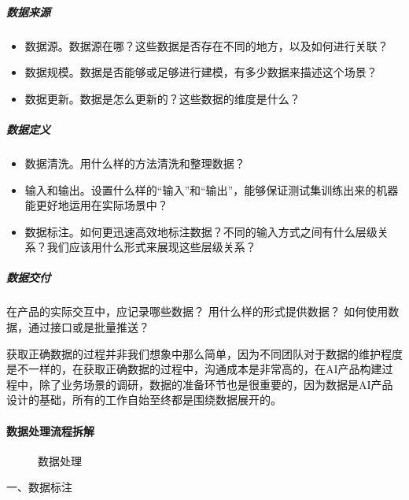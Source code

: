 \documentclass[letterpaper,10pt,english]{sphinxmanual}
\begin{document}
\subparagraph{数据来源}
\label{\detokenize{chapter_project/Data Process:id3}}\begin{itemize}
\item {} 
数据源。数据源在哪？这些数据是否存在不同的地方，以及如何进行关联？

\item {} 
数据规模。数据是否能够或足够进行建模，有多少数据来描述这个场景？

\item {} 
数据更新。数据是怎么更新的？这些数据的维度是什么？

\end{itemize}


\subparagraph{数据定义}
\label{\detokenize{chapter_project/Data Process:id4}}\begin{itemize}
\item {} 
数据清洗。用什么样的方法清洗和整理数据？

\item {} 
输入和输出。设置什么样的“输入”和“输出”，能够保证测试集训练出来的机器能更好地运用在实际场景中？

\item {} 
数据标注。如何更迅速高效地标注数据？不同的输入方式之间有什么层级关系？我们应该用什么形式来展现这些层级关系？

\end{itemize}


\subparagraph{数据交付}
\label{\detokenize{chapter_project/Data Process:id5}}\label{\detokenize{chapter_project/Data Process:id6}}
在产品的实际交互中，应记录哪些数据？ 用什么样的形式提供数据？
如何使用数据，通过接口或是批量推送？

获取正确数据的过程并非我们想象中那么简单，因为不同团队对于数据的维护程度是不一样的，在获取正确数据的过程中，沟通成本是非常高的，在AI产品构建过程中，除了业务场景的调研，数据的准备环节也是很重要的，因为数据是AI产品设计的基础，所有的工作自始至终都是围绕数据展开的。


\paragraph{数据处理流程拆解}
\label{\detokenize{chapter_project/Data Process:id7}}
\begin{figure}[H]
\centering
\capstart

\noindent{}
\caption{数据处理\sphinxfootnotemark[806]}\label{\detokenize{chapter_project/Data Process:id10}}\end{figure}
%
\begin{footnotetext}[806]\sphinxAtStartFootnote
{}
%
\end{footnotetext}\ignorespaces 
一、数据标注
\end{document}
